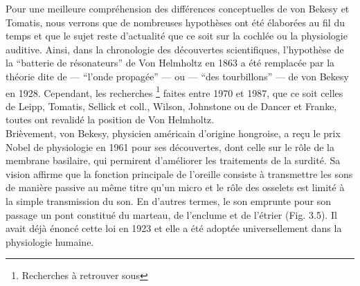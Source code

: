Pour une meilleure compréhension des différences conceptuelles de von Bekesy et Tomatis, nous 
verrons que de nombreuses  hypothèses ont été élaborées au fil du temps et que le sujet reste 
d'actualité que ce soit sur la cochlée ou  la physiologie auditive. %
Ainsi, dans la chronologie des découvertes scientifiques,  l'hypothèse de la ``batterie de
	résonateurs''  de Von Helmholtz en 1863  a été remplacée par la
théorie dite de  --- ``l'onde propagée'' --- ou --- ``des
tourbillons'' ---  de von Bekesy en 1928.
Cependant, 
les recherches  \footnote{ Recherches à retrouver sous\autocite[24--28] {auriol:cle}}
faites entre 1970 et 1987, que ce soit celles 
de  Leipp,  %
Tomatis,  %
Sellick et coll., %
 Wilson, %
Johnstone %
ou de Dancer et
Franke,  %
 toutes ont revalidé la position de Von Helmholtz.
\\
 Brièvement, von Bekesy, physicien américain d'origine hongroise, a reçu le prix
 Nobel de physiologie  en 1961 pour ses découvertes, dont celle sur le rôle de la membrane basilaire, qui 
 permirent 
 d'améliorer les traitements de la surdité. Sa vision affirme que la fonction principale de l'oreille 
 consiste à transmettre les sons de manière passive au même titre qu'un micro et le rôle des 
 osselets
 est limité à la simple transmission du son. En d'autres termes, le son emprunte pour son 
 passage un pont  constitué du marteau, de 
 l'enclume et de l'étrier (Fig. 3.5). Il avait déjà énoncé cette loi en 1923  et elle a été adoptée
 universellement dans la physiologie humaine.
